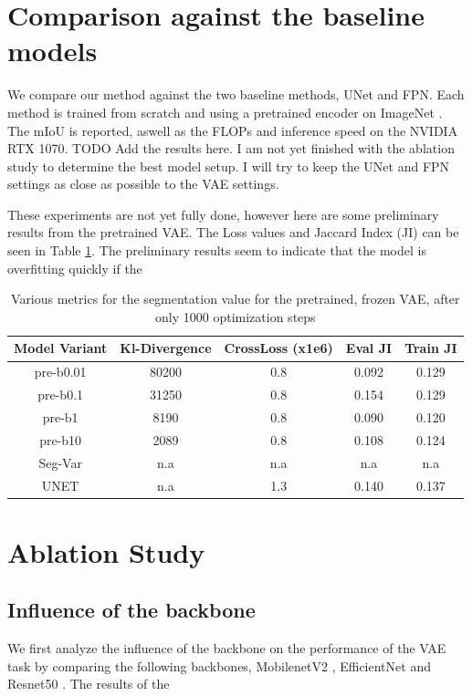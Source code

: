 \section{Comparison against the baseline models}
We compare our method against the two baseline methods, UNet and FPN. Each method is trained from scratch and using a pretrained encoder on ImageNet \cite{deng2009imagenet}. The mIoU is reported, aswell as the FLOPs and inference speed on the NVIDIA RTX 1070. 
TODO Add the results here. I am not yet finished with the ablation study to determine the best model setup. I will try to keep the UNet and FPN settings as close as possible to the VAE settings.

These experiments are not yet fully done, however here are some preliminary results from the pretrained VAE. The Loss values and Jaccard Index (JI) can be seen in Table \ref{tab:seg-vae}. The preliminary results seem to indicate that the model is overfitting quickly if the 

\begin{table}[!ht]
    \centering
    \caption{Various metrics for the segmentation value for the pretrained, frozen VAE, after only 1000 optimization steps}
    \label{tab:seg-vae}
    \begin{tabular}{ccccc}
        \hline
        Model Variant & Kl-Divergence & CrossLoss (x1e6) & Eval JI & Train JI \\
        \hline
        pre-b0.01     & 80200         & 0.8              & 0.092   & 0.129    \\
        pre-b0.1      & 31250         & 0.8              & 0.154   & 0.129    \\
        pre-b1        & 8190          & 0.8              & 0.090   & 0.120    \\
        pre-b10       & 2089          & 0.8              & 0.108   & 0.124    \\
        Seg-Var       & n.a           & n.a              & n.a     & n.a      \\
        UNET          & n.a           & 1.3              & 0.140   & 0.137    \\
        \hline
    \end{tabular}
\end{table}


\section{Ablation Study}
\subsection{Influence of the backbone}
We first analyze the influence of the backbone on the performance of the VAE task by comparing the following backbones, MobilenetV2 \cite{sandler2019mobilenetv2invertedresidualslinear}, EfficientNet \cite{tan2020efficientnetrethinkingmodelscaling} and Resnet50 \cite{he2015deep}. The results of the 

